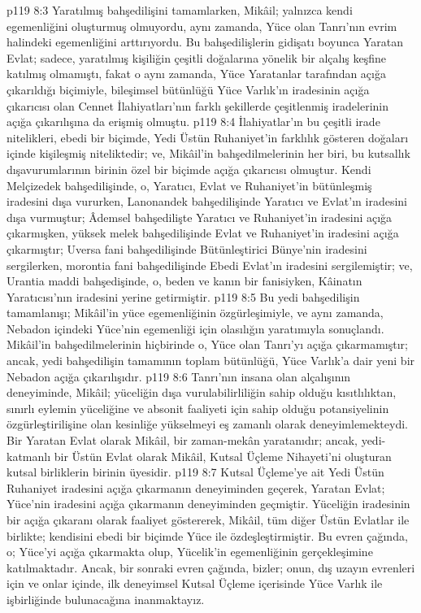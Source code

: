 \vs p119 8:3 Yaratılmış bahşedilişini tamamlarken, Mikâil; yalnızca kendi egemenliğini oluşturmuş olmuyordu, aynı zamanda, Yüce olan Tanrı’nın evrim halindeki egemenliğini arttırıyordu. Bu bahşedilişlerin gidişatı boyunca Yaratan Evlat; sadece, yaratılmış kişiliğin çeşitli doğalarına yönelik bir alçalış keşfine katılmış olmamıştı, fakat o aynı zamanda, Yüce Yaratanlar tarafından açığa çıkarıldığı biçimiyle, bileşimsel bütünlüğü Yüce Varlık’ın iradesinin açığa çıkarıcısı olan Cennet İlahiyatları’nın farklı şekillerde çeşitlenmiş iradelerinin açığa çıkarılışına da erişmiş olmuştu.
\vs p119 8:4 İlahiyatlar’ın bu çeşitli irade nitelikleri, ebedi bir biçimde, Yedi Üstün Ruhaniyet’in farklılık gösteren doğaları içinde kişileşmiş niteliktedir; ve, Mikâil’in bahşedilmelerinin her biri, bu kutsallık dışavurumlarının birinin özel bir biçimde açığa çıkarıcısı olmuştur. Kendi Melçizedek bahşedilişinde, o, Yaratıcı, Evlat ve Ruhaniyet’in bütünleşmiş iradesini dışa vururken, Lanonandek bahşedilişinde Yaratıcı ve Evlat’ın iradesini dışa vurmuştur; Âdemsel bahşedilişte Yaratıcı ve Ruhaniyet’in iradesini açığa çıkarmışken, yüksek melek bahşedilişinde Evlat ve Ruhaniyet’in iradesini açığa çıkarmıştır; Uversa fani bahşedilişinde Bütünleştirici Bünye’nin iradesini sergilerken, morontia fani bahşedilişinde Ebedi Evlat’ın iradesini sergilemiştir; ve, Urantia maddi bahşedişinde, o, beden ve kanın bir fanisiyken, Kâinatın Yaratıcısı’nın iradesini yerine getirmiştir.
\vs p119 8:5 Bu yedi bahşedilişin tamamlanışı; Mikâil’in yüce egemenliğinin özgürleşimiyle, ve aynı zamanda, Nebadon içindeki Yüce’nin egemenliği için olasılığın yaratımıyla sonuçlandı. Mikâil’in bahşedilmelerinin hiçbirinde o, Yüce olan Tanrı’yı açığa çıkarmamıştır; ancak, yedi bahşedilişin tamamının toplam bütünlüğü, Yüce Varlık’a dair yeni bir Nebadon açığa çıkarılışıdır.
\vs p119 8:6 Tanrı’nın insana olan alçalışının deneyiminde, Mikâil; yüceliğin dışa vurulabilirliliğin sahip olduğu kısıtlılıktan, sınırlı eylemin yüceliğine ve absonit faaliyeti için sahip olduğu potansiyelinin özgürleştirilişine olan kesinliğe yükselmeyi eş zamanlı olarak deneyimlemekteydi. Bir Yaratan Evlat olarak Mikâil, bir zaman\hyp{}mekân yaratanıdır; ancak, yedi\hyp{}katmanlı bir Üstün Evlat olarak Mikâil, Kutsal Üçleme Nihayeti’ni oluşturan kutsal birliklerin birinin üyesidir.
\vs p119 8:7 Kutsal Üçleme’ye ait Yedi Üstün Ruhaniyet iradesini açığa çıkarmanın deneyiminden geçerek, Yaratan Evlat; Yüce’nin iradesini açığa çıkarmanın deneyiminden geçmiştir. Yüceliğin iradesinin bir açığa çıkaranı olarak faaliyet göstererek, Mikâil, tüm diğer Üstün Evlatlar ile birlikte; kendisini ebedi bir biçimde Yüce ile özdeşleştirmiştir. Bu evren çağında, o; Yüce’yi açığa çıkarmakta olup, Yücelik’in egemenliğinin gerçekleşimine katılmaktadır. Ancak, bir sonraki evren çağında, bizler; onun, dış uzayın evrenleri için ve onlar içinde, ilk deneyimsel Kutsal Üçleme içerisinde Yüce Varlık ile işbirliğinde bulunacağına inanmaktayız.
